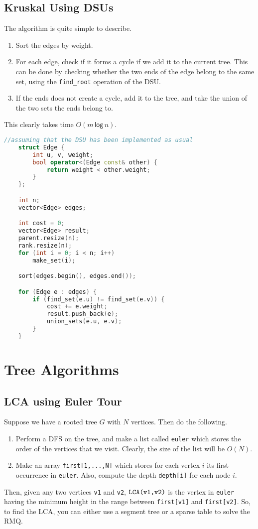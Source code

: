 \documentclass[12pt,a4paper]{amsart}
\numberwithin{equation}{section}
\theoremstyle{definition}
\begin{document}
\subsection{Kruskal Using DSUs} The algorithm is quite simple to describe.
\begin{enumerate}
    \item Sort the edges by weight.
    \item For each edge, check if it forms a cycle if we add it to the current tree. This can be done by checking whether the two ends of the edge belong to the same set, using the \verb|find_root| operation of the DSU.
    \item If the ends does not create a cycle, add it to the tree, and take the union of the two sets the ends belong to. 
\end{enumerate}
This clearly takes time $O(m\mathsf{\,log\,}n)$.

\begin{lstlisting}[language=C++]
    //assuming that the DSU has been implemented as usual
    struct Edge {
        int u, v, weight;
        bool operator<(Edge const& other) {
            return weight < other.weight;
        }
    };

    int n;
    vector<Edge> edges;

    int cost = 0;
    vector<Edge> result;
    parent.resize(n);
    rank.resize(n);
    for (int i = 0; i < n; i++)
        make_set(i);

    sort(edges.begin(), edges.end());

    for (Edge e : edges) {
        if (find_set(e.u) != find_set(e.v)) {
            cost += e.weight;
            result.push_back(e);
            union_sets(e.u, e.v);
        }
    }
\end{lstlisting}

\section{Tree Algorithms}

\subsection{LCA using Euler Tour} Suppose we have a rooted tree $G$ with $N$ vertices. Then do the following. 
\begin{enumerate}
    \item Perform a DFS on the tree, and make a list called \verb|euler| which stores the order of the vertices that we visit. Clearly, the size of the list will be $O(N)$.
    \item Make an array \verb|first[1,...,N]| which stores for each vertex $i$ its first occurrence in \verb|euler|. Also, compute the depth \verb|depth[i]| for each node $i$. 
\end{enumerate}
Then, given any two vertices \verb|v1| and \verb|v2|, $\verb|LCA(v1,v2)|$ is the vertex in \verb|euler| having the minimum height in the range between \verb|first[v1]| and \verb|first[v2]|. So, to find the LCA, you can either use a segment tree or a sparse table to solve the RMQ. 
\end{document}
